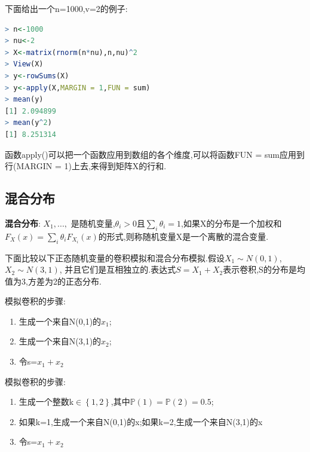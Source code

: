 \documentclass[11pt,a4paper,oneside]{book}
\begin{document}
下面给出一个n=1000,v=2的例子:
\begin{lstlisting}[language=r]
> n<-1000
> nu<-2
> X<-matrix(rnorm(n*nu),n,nu)^2
> View(X)
> y<-rowSums(X)
> y<-apply(X,MARGIN = 1,FUN = sum)
> mean(y)
[1] 2.094899
> mean(y^2)
[1] 8.251314
\end{lstlisting}
\begin{tcolorbox}[colback=pink!10!white,colframe=pink!100!black]
函数apply()可以把一个函数应用到数组的各个维度,可以将函数FUN = sum应用到行(MARGIN = 1)上去,来得到矩阵X的行和.
\end{tcolorbox}

\subsection{混合分布}
\textbf{混合分布}: $ X_1,...,$ 是随机变量,$ \theta_i>0 $且$ \sum_i \theta_i=1 $,如果X的分布是一个加权和$ F_X(x)=\sum_i \theta_iF_{X_i}(x) $的形式,则称随机变量X是一个离散的混合变量.

下面比较以下正态随机变量的卷积模拟和混合分布模拟.假设$ X_1\sim N(0,1) $, $ X_2\sim N(3,1) $, 并且它们是互相独立的.表达式$ S=X_1+X_2 $表示卷积,S的分布是均值为3,方差为2的正态分布.

模拟卷积的步骤:
\begin{enumerate}
	\item 生成一个来自N(0,1)的$ x_1 $;
	\item 生成一个来自N(3,1)的$ x_2 $;
	\item 令s=$ x_1+x_2 $
\end{enumerate}

模拟卷积的步骤:
\begin{enumerate}
	\item 生成一个整数k$ \in\left\lbrace 1,2\right\rbrace  $,其中$ \mathbb{P}(1)=\mathbb{P}(2)=0.5 $;
	\item 如果k=1,生成一个来自N(0,1)的x;如果k=2,生成一个来自N(3,1)的x
	\item 令s=$ x_1+x_2 $
\end{enumerate}
\end{document}

